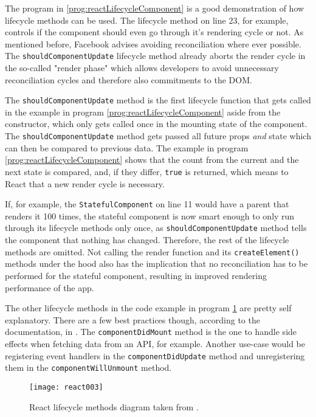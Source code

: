 The program in \ref{prog:reactLifecycleComponent} is a good demonstration of how lifecycle methods can be used. The lifecycle method on line 23, for example, controls if the component should even go through it's rendering cycle or not. As mentioned before, Facebook advises avoiding reconciliation where ever possible. The \texttt{shouldComponentUpdate} lifecycle method already aborts the render cycle in the so-called "render phase" which allows developers to avoid unnecessary reconciliation cycles and therefore also commitments to the DOM. 

The \texttt{shouldComponentUpdate} method is the first lifecycle function that gets called in the example in program \ref{prog:reactLifecycleComponent} aside from the constructor, which only gets called once in the mounting state of the component. The \texttt{shouldComponentUpdate} method gets passed all future props \emph{and} state which can then be compared to previous data. The example in program \ref{prog:reactLifecycleComponent} shows that the count from the current and the next state is compared, and, if they differ, \texttt{true} is returned, which means to React that a new render cycle is necessary. 

If, for example, the \texttt{StatefulComponent} on line 11 would have a parent that renders it 100 times, the stateful component is now smart enough to only run through its lifecycle methods only once, as \texttt{shouldComponentUpdate} method tells the component that nothing has changed. Therefore, the rest of the lifecycle methods are omitted. Not calling the render function and its \texttt{createElement()} methods under the hood also has the implication that no reconciliation has to be performed for the stateful component, resulting in improved rendering performance of the app.

The other lifecycle methods in the code example in program \ref{fig:reactLifecycleMethods} are pretty self explanatory. There are a few best practices though, according to the documentation, in \cite{React}. The \texttt{componentDidMount} method is the one to handle side effects when fetching data from an API, for example. Another use-case would be registering event handlers in the \texttt{componentDidUpdate} method and unregistering them in the \texttt{component\-Will\-Unmount} method.

\begin{figure}
  \centering
  \texttt{[image: react003]}
  \caption{React lifecycle methods diagram taken from \cite{ReactRenderCycleDiagram}.}
  \label{fig:reactLifecycleMethods}
\end{figure}

